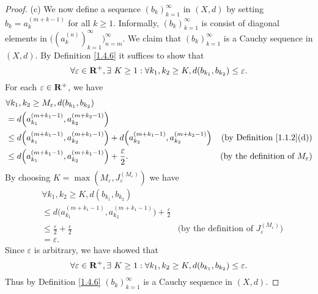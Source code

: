 \begin{proof}{(c)}
    We now define a sequence \((b_k)_{k = 1}^\infty\) in \((X, d)\) by setting \(b_k = a_k^{(m + k - 1)}\) for all \(k \geq 1\).
    Informally, \((b_k)_{k = 1}^\infty\) is consist of diagonal elements in \(\big((a_k^{(n)})_{k = 1}^\infty\big)_{n = m}^\infty\).
    We claim that \((b_k)_{k = 1}^\infty\) is a Cauchy sequence in \((X, d)\).
    By Definition \ref{1.4.6} it suffices to show that
    \[
        \forall \varepsilon \in \mathbf{R}^+, \exists\ K \geq 1 : \forall k_1, k_2 \geq K, d(b_{k_1}, b_{k_2}) \leq \varepsilon.
    \]
    For each \(\varepsilon \in \mathbf{R}^+\), we have
    \begin{align*}
         & \forall k_1, k_2 \geq M_\varepsilon, d(b_{k_1}, b_{k_2})                                                                                                                         \\
         & = d\Big(a_{k_1}^{(m + k_1 - 1)}, a_{k_2}^{(m + k_2 - 1)}\Big)                                                                                                                    \\
         & \leq d\Big(a_{k_1}^{(m + k_1 - 1)}, a_{k_2}^{(m + k_1 - 1)}\Big) + d\Big(a_{k_2}^{(m + k_1 - 1)}, a_{k_2}^{(m + k_2 - 1)}\Big) & \text{(by Definition \ref{1.1.2}(d))}           \\
         & \leq d\Big(a_{k_1}^{(m + k_1 - 1)}, a_{k_2}^{(m + k_1 - 1)}\Big) + \frac{\varepsilon}{2}.                                      & \text{(by the definition of \(M_\varepsilon\))}
    \end{align*}
    By choosing \(K = \max(M_\varepsilon, J_\varepsilon^{(M_\varepsilon)})\) we have
    \begin{align*}
         & \forall k_1, k_2 \geq K, d(b_{k_1}, b_{k_2})                                                                                                                 \\
         & \leq d\Big(a_{k_1}^{(m + k_1 - 1)}, a_{k_2}^{(m + k_1 - 1)}\Big) + \frac{\varepsilon}{2}                                                                     \\
         & \leq \frac{\varepsilon}{2} + \frac{\varepsilon}{2}                                       & \text{(by the definition of \(J_\varepsilon^{(M_\varepsilon)}\))} \\
         & = \varepsilon.
    \end{align*}
    Since \(\varepsilon\) is arbitrary, we have showed that
    \[
        \forall \varepsilon \in \mathbf{R}^+, \exists\ K \geq 1 : \forall k_1, k_2 \geq K, d(b_{k_1}, b_{k_2}) \leq \varepsilon.
    \]
    Thus by Definition \ref{1.4.6} \((b_k)_{k = 1}^\infty\) is a Cauchy sequence in \((X, d)\).


\end{proof}
